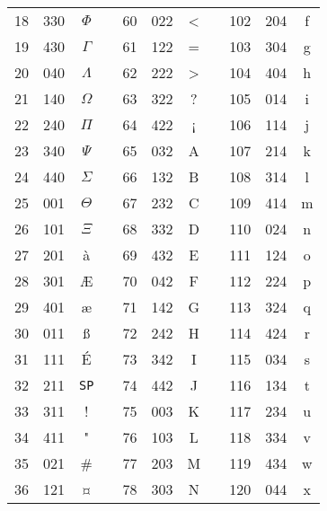 \documentclass{article}
\begin{document}
{\begin{longtable}{|l|l|c|c|l|l|c|c|l|l|c|}
  \cline{1-3}
  \cline{5-7}
  \cline{9-11}
  18 & 330 & $\Phi$ & & 60 & 022 & < & & 102 & 204 & f \\
  \cline{1-3}
  \cline{5-7}
  \cline{9-11}
  19 & 430 & $\Gamma$ & & 61 & 122 & =  & & 103 & 304 & g \\
  \cline{1-3}
  \cline{5-7}
  \cline{9-11}
  20 & 040 & $\Lambda$ & & 62 & 222 & > & & 104 & 404 & h \\
  \cline{1-3}
  \cline{5-7}
  \cline{9-11}
  21 & 140 & $\Omega$ & & 63 & 322 & ? & & 105 & 014 & i \\
  \cline{1-3}
  \cline{5-7}
  \cline{9-11}
  22 & 240 & $\Pi$ & & 64 & 422 & ¡ & & 106 & 114 & j \\
  \cline{1-3}
  \cline{5-7}
  \cline{9-11}
  23 & 340 & $\Psi$ & & 65 & 032 & A & & 107 & 214 & k \\
  \cline{1-3}
  \cline{5-7}
  \cline{9-11}
  24 & 440 & $\Sigma$ & & 66 & 132 & B & & 108 & 314 & l \\
  \cline{1-3}
  \cline{5-7}
  \cline{9-11}
  25 & 001 & $\Theta$ & & 67 & 232 & C & & 109 & 414 & m \\
  \cline{1-3}
  \cline{5-7}
  \cline{9-11}
  26 & 101 & $\Xi$ & & 68 & 332 & D & & 110 & 024 & n \\
  \cline{1-3}
  \cline{5-7}
  \cline{9-11}
  27 & 201 & à & & 69 & 432 & E & & 111 & 124 & o \\
  \cline{1-3}
  \cline{5-7}
  \cline{9-11}
  28 & 301 & Æ & & 70 & 042 & F & & 112 & 224  & p \\
  \cline{1-3}
  \cline{5-7}
  \cline{9-11}
  29 & 401 & æ & & 71 & 142 & G & & 113 & 324 & q \\
  \cline{1-3}
  \cline{5-7}
  \cline{9-11}
  30 & 011 & ß & & 72 & 242 & H & & 114 & 424 & r \\
  \cline{1-3}
  \cline{5-7}
  \cline{9-11}
  31 & 111 & É & & 73 & 342 & I & & 115 & 034 & s \\
  \cline{1-3}
  \cline{5-7}
  \cline{9-11}
  32 & 211 & \verb+SP+ & & 74 & 442 & J & & 116 & 134 & t \\
  \cline{1-3}
  \cline{5-7}
  \cline{9-11}
  33 & 311 & ! & & 75 & 003 & K & & 117 & 234 & u \\
  \cline{1-3}
  \cline{5-7}
  \cline{9-11}
  34 & 411 & " & & 76 & 103 & L & & 118 & 334 & v \\
  \cline{1-3}
  \cline{5-7}
  \cline{9-11}
  35 & 021 & \# & & 77 & 203 & M & & 119 & 434 & w \\
  \cline{1-3}
  \cline{5-7}
  \cline{9-11}
  36 & 121 & ¤ & & 78 & 303 & N & & 120 & 044 & x \\

\end{longtable}}
\end{document}

